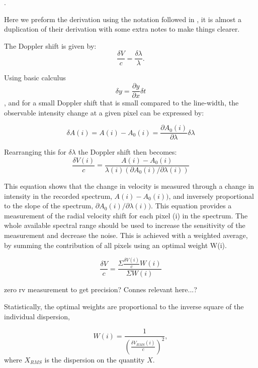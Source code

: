 .

Here we preform the derivation using the notation followed in \citet{bouchy_fundamental_2001}, it is almost a duplication of their derivation with some extra notes to make things clearer.


The Doppler shift is given by:
\begin{equation}
\frac{\delta V}{c} = \frac{\delta \lambda}{\lambda}.
\label{eq:dopplershift}
\end{equation}

Using basic calculus \[\delta y = \frac{\partial y}{\partial x} \delta t  \nonumber\], and for a small Doppler shift that is small compared to the line-width, the observable intensity change at a given pixel can be expressed by:

\begin{equation}
\delta A(i) = A(i) - A_0(i) = \frac{\partial A_0(i)}{\partial \lambda} \delta \lambda 
\end{equation}

Rearranging this for \(\delta \lambda\) the Doppler shift then becomes:
\begin{equation}
    \frac{\delta V(i)}{c} = \frac{A(i) - A_0(i) }{\lambda(i) (\partial A_0(i)/\partial \lambda(i))}
\end{equation}

This equation shows that the change in velocity is measured through a change in intensity in the recorded spectrum, \(A(i)-A_0(i))\), and inversely proportional to the slope of the spectrum, \(\partial A_0(i)/\partial \lambda(i))\). 
This equation provides a measurement of the radial velocity shift for each pixel (i) in the spectrum. The whole available spectral range should be used to increase the sensitivity of the measurement and decrease the noise. This is achieved with a weighted average, by summing the contribution of all pixels using an optimal weight W(i).


\begin{equation}
\frac{\delta V}{c} = \frac{\Sigma{ \frac{\delta V(i)}{c}W(i)}}{\Sigma {W(i)}}
\end{equation}

 zero rv measurement to get precision? Connes relevant here...?

Statistically, the optimal weights are proportional to the inverse square of the individual dispersion,

\begin{equation}
W(i) = \frac{1}{\left(\frac{\delta V_{RMS}(i)}{c}\right)^2},
\end{equation}
where $X_{RMS}$ is the dispersion on the quantity $X$.


